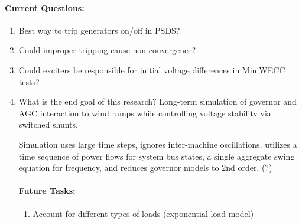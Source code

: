 \documentclass[12pt]{article}
\begin{document}
\begin{multicols}{2}
	\paragraph{Current Questions:}
	\begin{enumerate}
	
	\item Best way to trip generators on/off in PSDS?
	\item Could improper tripping cause non-convergence?
	
	\item Could exciters be responsible for initial voltage differences in MiniWECC tests?

	\item What is the end goal of this research?
	\subitem Long-term simulation of governor and AGC interaction to wind ramps while controlling voltage stability via switched shunts.
	
	 Simulation uses large time steps, ignores inter-machine oscillations, utilizes a time sequence of power flows for system bus states, a single aggregate swing equation for frequency, and reduces governor models to 2nd order. (?)
	
		



\vfill\null
\columnbreak

\paragraph{Future Tasks:} %
	\begin{enumerate}

		\item Account for different types of loads (exponential load model)
		

\end{enumerate}
\end{enumerate}
\end{multicols}
\end{document}
